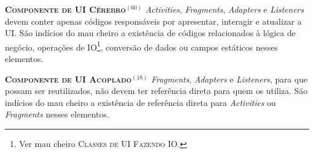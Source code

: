   \noindent
  \textsc{\textbf{{\small Componente de UI Cérebro}}}$^{(60)}$ \textit{Activities}, \textit{Fragments}, \textit{Adapters} e \textit{Listeners} devem conter apenas códigos responsáveis por apresentar, interagir e atualizar a UI. São indícios do mau cheiro a existência de códigos relacionados à lógica de negócio, operações de IO\footnote{Ver mau cheiro \textsc{\small Classes de UI Fazendo IO}.}, conversão de dados ou campos estáticos nesses elementos.

  
  \noindent
  \textbf{\textsc{{\small Componente de UI Acoplado}}}$^{(18)}$ \textit{Fragments}, \textit{Adapters} e \textit{Listeners}, para que possam ser reutilizados, não devem ter referência direta para quem os utiliza. São indícios do mau cheiro a existência de referência direta para \textit{Activities} ou \textit{Fragments} nesses elementos.


